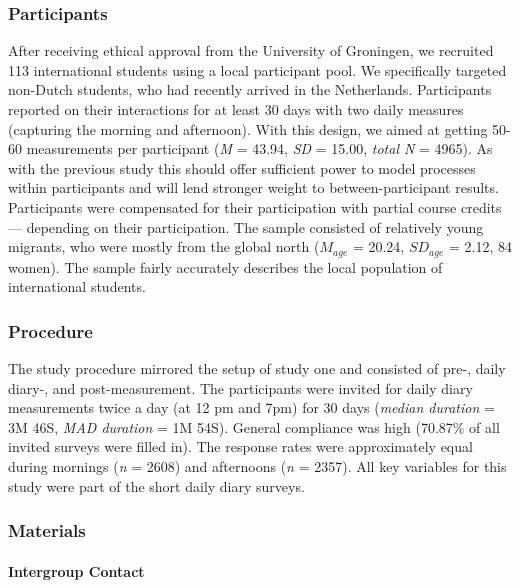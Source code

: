 \documentclass[man, 12pt, a4paper]{apa7}
\theoremstyle{break}
\theoremstyle{plain}
\begin{document}
\subsubsection{Participants}

After receiving ethical approval from the University of Groningen, we
recruited 113 international students using a local participant pool. We
specifically targeted non-Dutch students, who had recently arrived in
the Netherlands. Participants reported on their interactions for at
least 30 days with two daily measures (capturing the morning and
afternoon). With this design, we aimed at getting 50-60 measurements per
participant (\textit{M} = 43.94, \textit{SD} = 15.00, \textit{total N} =
4965). As with the previous study this should offer sufficient power to
model processes within participants and will lend stronger weight to
between-participant results. Participants were compensated for their
participation with partial course credits --- depending on their
participation. The sample consisted of relatively young migrants, who
were mostly from the global north (\(M_{age}\) = 20.24, \(SD_{age}\) =
2.12, 84 women). The sample fairly accurately describes the local
population of international students.

\subsubsection{Procedure}

The study procedure mirrored the setup of study one and consisted of
pre-, daily diary-, and post-measurement. The participants were invited
for daily diary measurements twice a day (at 12 pm and 7pm) for 30 days
(\textit{median duration} = 3M 46S, \textit{MAD duration} = 1M 54S).
General compliance was high (70.87\% of all invited surveys were filled
in). The response rates were approximately equal during mornings
(\textit{n} = 2608) and afternoons (\textit{n} = 2357). All key
variables for this study were part of the short daily diary surveys.

\subsubsection{Materials}

\paragraph{Intergroup Contact}
\end{document}
